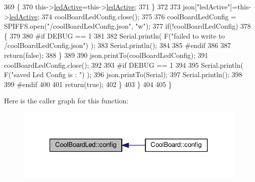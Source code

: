 \begin{DoxyCode}
369             \{
370                 this->\hyperlink{class_cool_board_led_aadd04d2ecf123247718d77f42fba7f08}{ledActive}=this->\hyperlink{class_cool_board_led_aadd04d2ecf123247718d77f42fba7f08}{ledActive};          
371             \}
372             
373             json[\textcolor{stringliteral}{"ledActive"}]=this->\hyperlink{class_cool_board_led_aadd04d2ecf123247718d77f42fba7f08}{ledActive};
374             coolBoardLedConfig.close();
375             
376             coolBoardLedConfig = SPIFFS.open(\textcolor{stringliteral}{"/coolBoardLedConfig.json"}, \textcolor{stringliteral}{"w"});
377             \textcolor{keywordflow}{if}(!coolBoardLedConfig)
378             \{
379             
380 \textcolor{preprocessor}{            #if DEBUG == 1 }
381 
382                 Serial.println( F(\textcolor{stringliteral}{"failed to write to /coolBoardLedConfig.json"}) );
383                 Serial.println();
384 
385 \textcolor{preprocessor}{            #endif}
386 
387                 \textcolor{keywordflow}{return}(\textcolor{keyword}{false});          
388             \}
389 
390             json.printTo(coolBoardLedConfig);
391             coolBoardLedConfig.close();
392 
393 \textcolor{preprocessor}{        #if DEBUG == 1}
394     
395             Serial.println( F(\textcolor{stringliteral}{"saved Led Config is : "}) );
396             json.printTo(Serial);
397             Serial.println();
398 
399 \textcolor{preprocessor}{        #endif}
400 
401             \textcolor{keywordflow}{return}(\textcolor{keyword}{true}); 
402         \}
403     \}   
404 
405 \}               
\end{DoxyCode}
Here is the caller graph for this function\+:\nopagebreak
\begin{figure}[H]
\begin{center}
\leavevmode
\includegraphics[width=321pt]{de/dc0/class_cool_board_led_a1b60e5e30bea96c49ed62ed1bf1ffc8b_icgraph}
\end{center}
\end{figure}
\mbox{\label{class_cool_board_led_a69f323359e0c9f797422f2152b5d41ef}} 
